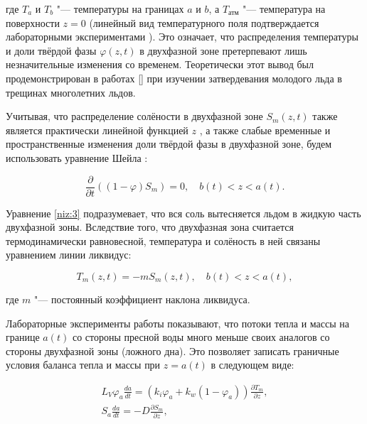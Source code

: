 где $T_a$ и $T_b$ "--- температуры на границах $a$ и $b$, а $T_{\text{атм}}$ "--- температура на поверхности $z=0$ (линейный вид температурного поля подтверждается лабораторными экспериментами \cite{niz:bib:1}). Это означает, что распределения температуры и доли твёрдой фазы $\varphi(z,t)$ в двухфазной зоне претерпевают лишь незначительные изменения со временем. Теоретически этот вывод был продемонстрирован в работах [] при изучении затвердевания молодого льда в трещинах многолетних льдов.



Учитывая, что распределение солёности в двухфазной зоне $S_m(z,t)$ также является практически линейной функцией $z$ \cite{niz:bib:1}, а также слабые временные и пространственные изменения доли твёрдой фазы в двухфазной зоне, будем использовать уравнение Шейла \cite{niz:bib:19}:

\begin{equation}

\frac{\partial}{\partial t}((1-\varphi)S_m)=0, \quad b(t)<z<a(t).

\label{niz:3}

\end{equation}

Уравнение \eqref{niz:3} подразумевает, что вся соль вытесняется льдом в жидкую часть двухфазной зоны. Вследствие того, что двухфазная зона считается термодинамически равновесной, температура и солёность в ней связаны уравнением линии ликвидус:

\begin{equation}

T_m(z,t)=-mS_m(z,t), \quad b(t)<z<a(t),

\label{niz:4}

\end{equation}

где $m$ "--- постоянный коэффициент наклона ликвидуса.



Лабораторные эксперименты работы \cite{niz:bib:1} показывают, что потоки тепла и массы на границе $a(t)$ со стороны пресной воды много меньше своих аналогов со стороны двухфазной зоны (ложного дна). Это позволяет записать граничные условия баланса тепла и массы при $z=a(t)$ в следующем виде:

\begin{gather}

L_V\varphi_a\frac{da}{dt}=(k_i\varphi_a+k_w(1-\varphi_a))\frac{\partial T_m}{\partial z},

\label{niz:5}


\\


S_a\frac{da}{dt}=-D\frac{\partial S_m}{\partial z},

\label{niz:6}

\end{gather}

